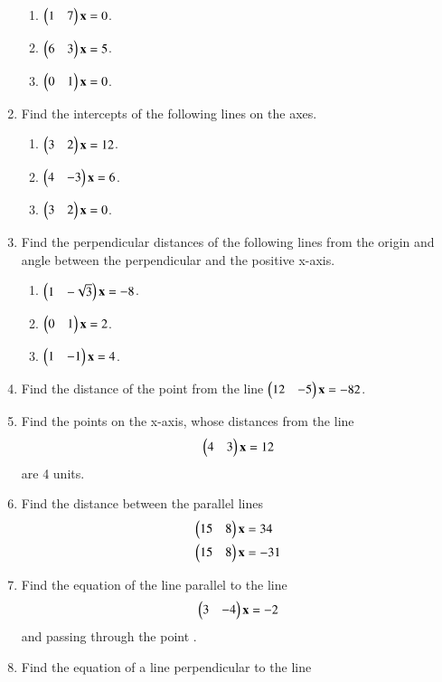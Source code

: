 \begin{enumerate}[label=\arabic*.,ref=\thesubsection.\theenumi]
\begin{enumerate}
\item $\begin{pmatrix}1 & 7\end{pmatrix}\mathbf{x} = 0$.
\item $\begin{pmatrix}6 & 3\end{pmatrix}\mathbf{x} = 5$.
\item $\begin{pmatrix}0 & 1\end{pmatrix}\mathbf{x} = 0$.
\end{enumerate}
\item Find the intercepts of the following  lines on the axes.
\begin{enumerate}
\item $\begin{pmatrix}3 & 2\end{pmatrix}\mathbf{x} = 12$.
\item $\begin{pmatrix}4 & -3\end{pmatrix}\mathbf{x} = 6$.
\item $\begin{pmatrix}3 & 2\end{pmatrix}\mathbf{x} = 0$.
\end{enumerate}
\item Find the perpendicular distances of the following lines from the origin and angle between the perpendicular and the positive x-axis.
\begin{enumerate}
\item $\begin{pmatrix}1 & -\sqrt{3}\end{pmatrix}\mathbf{x} = -8$.
\item $\begin{pmatrix}0 & 1\end{pmatrix}\mathbf{x} = 2$.
\item $\begin{pmatrix}1 & -1\end{pmatrix}\mathbf{x} = 4$.
\end{enumerate}
\item Find the distance of the point  from the line $\begin{pmatrix}12 & -5\end{pmatrix}\mathbf{x} = -82$.
\\
\solution

\item Find the points on the x-axis, whose distances from the line 
\begin{align}
\begin{pmatrix}4 & 3\end{pmatrix} \mathbf{x} = 12
\end{align}
are 4 units.
%
\\
\solution

\item Find the distance between the parallel lines
%
\begin{align}
\begin{pmatrix}15 & 8\end{pmatrix}\mathbf{x} &= 34
\\
\begin{pmatrix}15 & 8\end{pmatrix}\mathbf{x} &= -31
\end{align}
\item Find the equation of the line parallel to the line 
\begin{align}
\begin{pmatrix}3 & -4\end{pmatrix}\mathbf{x} = -2
\end{align}
%
and passing through the point .
\item Find the equation of a line perpendicular to the line 
\begin{align}

\end{align}
\end{enumerate}
